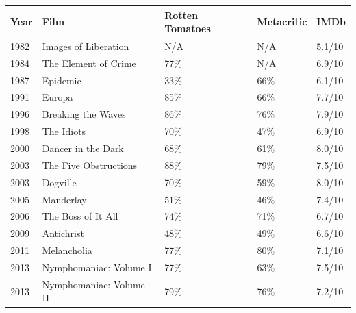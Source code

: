 \documentclass{article}
\begin{document}
\begin{tabular}{lllll}
\toprule
Year & Film & Rotten Tomatoes & Metacritic & IMDb \\
\midrule
1982 & Images of Liberation & N/A & N/A & 5.1/10 \\
1984 & The Element of Crime & 77\% & N/A & 6.9/10 \\
1987 & Epidemic & 33\% & 66\% & 6.1/10 \\
1991 & Europa & 85\% & 66\% & 7.7/10 \\
1996 & Breaking the Waves & 86\% & 76\% & 7.9/10 \\
1998 & The Idiots & 70\% & 47\% & 6.9/10 \\
2000 & Dancer in the Dark & 68\% & 61\% & 8.0/10 \\
2003 & The Five Obstructions & 88\% & 79\% & 7.5/10 \\
2003 & Dogville & 70\% & 59\% & 8.0/10 \\
2005 & Manderlay & 51\% & 46\% & 7.4/10 \\
2006 & The Boss of It All & 74\% & 71\% & 6.7/10 \\
2009 & Antichrist & 48\% & 49\% & 6.6/10 \\
2011 & Melancholia & 77\% & 80\% & 7.1/10 \\
2013 & Nymphomaniac: Volume I & 77\% & 63\% & 7.5/10 \\
2013 & Nymphomaniac: Volume II & 79\% & 76\% & 7.2/10 \\
\bottomrule
\end{tabular}
\end{document}
